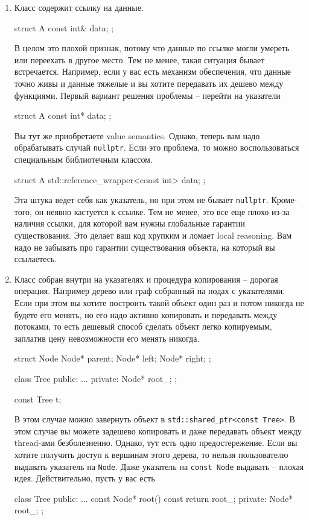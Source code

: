 \begin{enumerate}
\item\label{section::fragile::reference} Класс содержит ссылку на данные.
\begin{cppcode}
struct A {
  const int& data;
};
\end{cppcode}
В целом это плохой признак, потому что данные по ссылке могли умереть или переехать в другое место.
Тем не менее, такая ситуация бывает встречается.
Например, если у вас есть механизм обеспечения, что данные точно живы и данные тяжелые и вы хотите передавать их дешево между функциями.
Первый вариант решения проблемы -- перейти на указатели
\begin{cppcode}
struct A {
  const int* data;
};
\end{cppcode}
Вы тут же приобретаете value semantics.
Однако, теперь вам надо обрабатывать случай \verb"nullptr".
Если это проблема, то можно воспользоваться специальным библиотечным классом.
\begin{cppcode}
struct A {
  std::reference_wrapper<const int> data;
};
\end{cppcode}
Эта штука ведет себя как указатель, но при этом не бывает \verb"nullptr".
Кроме-того, он неявно кастуется к ссылке.
Тем не менее, это все еще плохо из-за наличия ссылки, для которой вам нужны глобальные гарантии существования.
Это делает ваш код хрупким и ломает local reasoning.
Вам надо не забывать про гарантии существования объекта, на который вы ссылаетесь.

\item Класс собран внутри на указателях и процедура копирования -- дорогая операция.
Например дерево или граф собранный на нодах с указателями.
Если при этом вы хотите построить такой объект один раз и потом никогда не будете его менять, но его надо активно копировать и передавать между потоками, то есть дешевый способ сделать объект легко копируемым, заплатив цену невозможности его менять никогда.
\begin{cppcode}
struct Node {
  Node* parent;
  Node* left;
  Node* right;
};

class Tree {
public:
  ...
private:
  Node* root_;
};

const Tree t;
\end{cppcode}
В этом случае можно завернуть объект в \verb"std::shared_ptr<const Tree>".
В этом случае вы можете задешево копировать и даже передавать объект между thread-ами безболезненно.
Однако, тут есть одно предостережение.
Если вы хотите получить доступ к вершинам этого дерева, то нельзя пользователю выдавать указатель на \verb"Node".
Даже указатель на \verb"const Node" выдавать -- плохая идея.
Действительно, пусть у вас есть
\begin{cppcode}
class Tree {
public:
  ...
  const Node* root() const {
    return root_;
  }
private:
  Node* root_;
};


\end{cppcode}
\end{enumerate}
